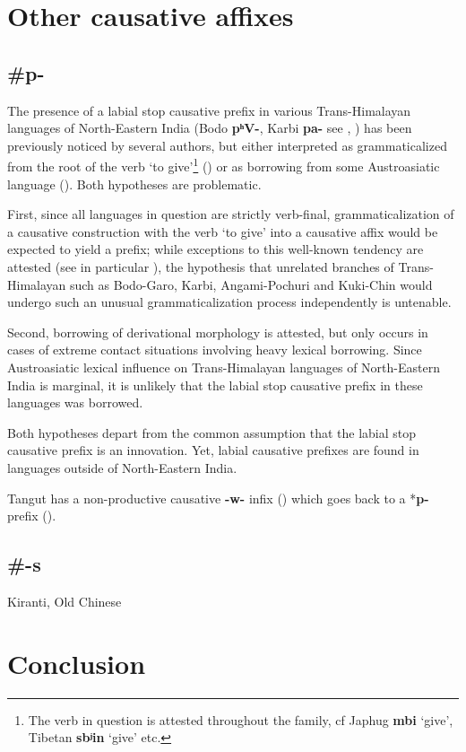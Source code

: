 \documentclass[oldfontcommands,oneside,a4paper,11pt]{article}
\newcommand{\ipa}[1]{\textbf{{\phon\mbox{#1}}}} %
\begin{document}
\section{Other causative affixes}
\subsection{\#p-}
The presence of a labial stop causative prefix in various Trans-Himalayan languages of North-Eastern India (Bodo \ipa{pʰV-}, Karbi \ipa{pa-} see \citealt{delancey15adjectival}, \citealt{konnerth15cisloc}) has been previously noticed by several authors, but either interpreted as  grammaticalized from the root of the verb `to give'\footnote{The verb in question is attested throughout the family, cf Japhug \ipa{mbi} `give', Tibetan \ipa{sbʲin} `give' etc.}
(\citealt[132]{matisoff03}) or as borrowing from some Austroasiatic language (\citealt{konnerth15cisloc, delancey15adjectival}). Both hypotheses are problematic. 

First, since all languages in question are strictly verb-final, grammaticalization of a causative construction with the verb `to give' into a causative affix would be expected to yield a prefix; while exceptions to this well-known tendency are attested (see in particular \citealt{jacques13harmonization}), the hypothesis that unrelated branches of Trans-Himalayan such as Bodo-Garo, Karbi, Angami-Pochuri and Kuki-Chin would undergo such an unusual grammaticalization process independently is untenable. 

Second, borrowing of derivational morphology is attested, but only occurs in cases of extreme contact situations involving heavy lexical borrowing. Since Austroasiatic lexical influence on Trans-Himalayan languages of North-Eastern India is marginal, it is unlikely that the labial stop causative prefix in these languages was borrowed.

Both hypotheses depart from the common assumption that the labial stop causative prefix is an innovation. Yet, labial causative prefixes are found in languages outside of North-Eastern India. 

Tangut has a non-productive causative \ipa{-w-} infix (\citealt{gong88alternations}) which goes back to a *\ipa{p-} prefix (\citealt[253-4]{jacques14esquisse}).

\citet{jacques15causative}
\citet{jackson14morpho}
\citet{jackson06paisheng}
\citet{lai13affixale}


\citet{delancey15adjectival}
\subsection{\#-s}
Kiranti, Old Chinese
\citet{michailovsky85dental}
\citet{jacques15derivational.khaling}
\section{Conclusion}
 


\end{document}
